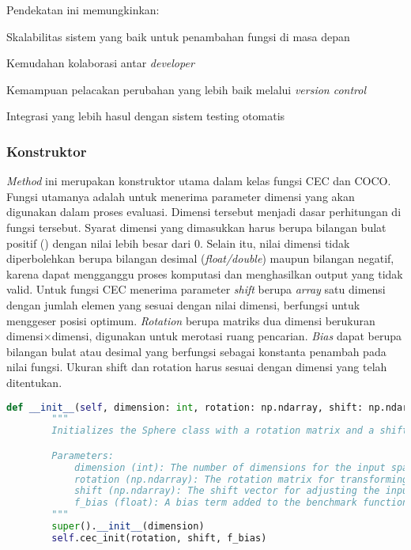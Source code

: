 Pendekatan ini memungkinkan:
\begin{packed_enum}
	\item Skalabilitas sistem yang baik untuk penambahan fungsi di masa depan
	\item Kemudahan kolaborasi antar \textit{developer} 
	\item Kemampuan pelacakan perubahan yang lebih baik melalui \textit{version control}
	\item Integrasi yang lebih hasul dengan sistem testing otomatis
\end{packed_enum}
\subsubsection{Konstruktor}
\textit{Method} ini merupakan konstruktor utama dalam kelas fungsi CEC dan COCO. Fungsi utamanya adalah untuk menerima parameter dimensi yang akan digunakan dalam proses evaluasi. Dimensi tersebut menjadi dasar perhitungan di fungsi tersebut. Syarat dimensi yang dimasukkan harus berupa bilangan bulat positif () dengan nilai lebih besar dari 0. Selain itu, nilai dimensi tidak diperbolehkan berupa bilangan desimal (\textit{float/double}) maupun bilangan negatif, karena dapat mengganggu proses komputasi dan menghasilkan output yang tidak valid. Untuk fungsi CEC menerima parameter \textit{shift} berupa \textit{array} satu dimensi dengan jumlah elemen yang sesuai dengan nilai dimensi, berfungsi untuk menggeser posisi optimum. \textit{Rotation} berupa matriks dua dimensi berukuran dimensi$\times$dimensi, digunakan untuk merotasi ruang pencarian. \textit{Bias} dapat berupa bilangan bulat atau desimal yang berfungsi sebagai konstanta penambah pada nilai fungsi. Ukuran shift dan rotation harus sesuai dengan dimensi yang telah ditentukan.
\begin{lstlisting}[language=Python, caption=kontruktor kelas fungsi CEC, label=lst:init_cec]
    def __init__(self, dimension: int, rotation: np.ndarray, shift: np.ndarray, f_bias: float = 0) -> None:
        """
        Initializes the Sphere class with a rotation matrix and a shift vector.

        Parameters:
            dimension (int): The number of dimensions for the input space. Must be a positive integer.
            rotation (np.ndarray): The rotation matrix for transforming the input vector.
            shift (np.ndarray): The shift vector for adjusting the input vector.
            f_bias (float): A bias term added to the benchmark function's output. Defaults to 0.
        """
        super().__init__(dimension)
        self.cec_init(rotation, shift, f_bias)
\end{lstlisting}
